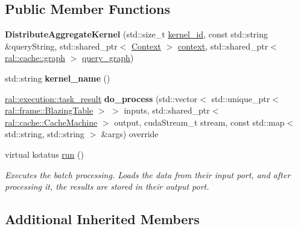 \subsection*{Public Member Functions}
\begin{DoxyCompactItemize}
\item 
\mbox{\label{classral_1_1batch_1_1DistributeAggregateKernel_a893eb5d37539281ba7f5588de21eb2fc}} 
{\bfseries Distribute\+Aggregate\+Kernel} (std\+::size\+\_\+t \hyperlink{classral_1_1cache_1_1kernel_a2fd708656cb056a41ec635b8bdc4acfe}{kernel\+\_\+id}, const std\+::string \&query\+String, std\+::shared\+\_\+ptr$<$ \hyperlink{classblazingdb_1_1manager_1_1Context}{Context} $>$ \hyperlink{classral_1_1cache_1_1kernel_af0347d14d678cfa7205c1387746a2e1b}{context}, std\+::shared\+\_\+ptr$<$ \hyperlink{classral_1_1cache_1_1graph}{ral\+::cache\+::graph} $>$ \hyperlink{classral_1_1cache_1_1kernel_a5fbb02292aff165a28ef25e75f0d89bd}{query\+\_\+graph})
\item 
\mbox{\label{classral_1_1batch_1_1DistributeAggregateKernel_a56a74d8d36d8f2f8df746bf65f81aa16}} 
std\+::string {\bfseries kernel\+\_\+name} ()
\item 
\mbox{\label{classral_1_1batch_1_1DistributeAggregateKernel_abe4c3c596bc964becc3ce3cdd7b31a0e}} 
\hyperlink{structral_1_1execution_1_1task__result}{ral\+::execution\+::task\+\_\+result} {\bfseries do\+\_\+process} (std\+::vector$<$ std\+::unique\+\_\+ptr$<$ \hyperlink{classral_1_1frame_1_1BlazingTable}{ral\+::frame\+::\+Blazing\+Table} $>$ $>$ inputs, std\+::shared\+\_\+ptr$<$ \hyperlink{classral_1_1cache_1_1CacheMachine}{ral\+::cache\+::\+Cache\+Machine} $>$ output, cuda\+Stream\+\_\+t stream, const std\+::map$<$ std\+::string, std\+::string $>$ \&args) override
\item 
virtual kstatus \hyperlink{classral_1_1batch_1_1DistributeAggregateKernel_a9508b135d44027058ce72ace2ffba98f}{run} ()
\begin{DoxyCompactList}\small\item\em Executes the batch processing. Loads the data from their input port, and after processing it, the results are stored in their output port. \end{DoxyCompactList}\end{DoxyCompactItemize}
\subsection*{Additional Inherited Members}


